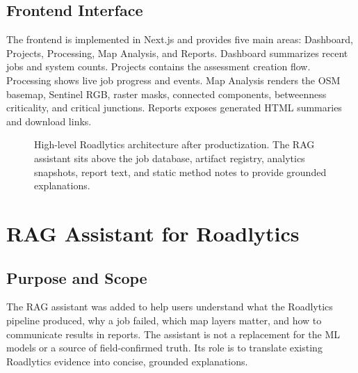﻿\documentclass[conference]{IEEEtran}
\begin{document}
\subsection{Frontend Interface}
The frontend is implemented in Next.js and provides five main areas: Dashboard, Projects, Processing, Map Analysis, and Reports. Dashboard summarizes recent jobs and system counts. Projects contains the assessment creation flow. Processing shows live job progress and events. Map Analysis renders the OSM basemap, Sentinel RGB, raster masks, connected components, betweenness criticality, and critical junctions. Reports exposes generated HTML summaries and download links.

\begin{figure}[!t]
\centering
{}
\caption{High-level Roadlytics architecture after productization. The RAG assistant sits above the job database, artifact registry, analytics snapshots, report text, and static method notes to provide grounded explanations.}
\label{fig:architecture}
\end{figure}

\section{RAG Assistant for Roadlytics}
\subsection{Purpose and Scope}
The RAG assistant was added to help users understand what the Roadlytics pipeline produced, why a job failed, which map layers matter, and how to communicate results in reports. The assistant is not a replacement for the ML models or a source of field-confirmed truth. Its role is to translate existing Roadlytics evidence into concise, grounded explanations.
\end{document}
